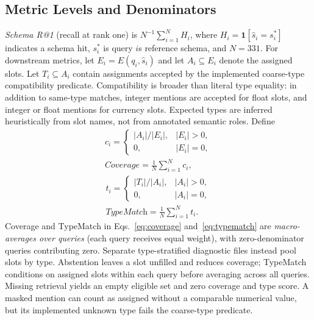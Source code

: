 \documentclass[pdflatex,iicol,sn-basic,Numbered]{sn-jnl}
\begin{document}
\subsection{Metric Levels and Denominators}\label{subsec:metrics}
\textit{Schema R@1} (recall at rank one) is $N^{-1}\sum_{i=1}^N H_i$, where $H_i=\mathbf{1}[\hat{s}_i=s_i^*]$ indicates a schema hit, $s_i^*$ is query $i$\textquotesingle s reference schema, and $N=331$. For downstream metrics, let $E_i=E(q_i,\hat{s}_i)$ and let $A_i\subseteq E_i$ denote the assigned slots. Let $T_i\subseteq A_i$ contain assignments accepted by the implemented coarse-type compatibility predicate. Compatibility is broader than literal type equality: in addition to same-type matches, integer mentions are accepted for float slots, and integer or float mentions for currency slots. Expected types are inferred heuristically from slot names, not from annotated semantic roles. Define
\begin{equation}
\begin{gathered}
c_i=\begin{cases}|A_i|/|E_i|,& |E_i|>0,\\0,& |E_i|=0,\end{cases}
\\[3pt]
\textit{Coverage}=\frac{1}{N}\sum_{i=1}^N c_i,
\end{gathered}
\label{eq:coverage}
\end{equation}
\begin{equation}
\begin{gathered}
t_i=\begin{cases}|T_i|/|A_i|,& |A_i|>0,\\0,& |A_i|=0,\end{cases}
\\[3pt]
\textit{TypeMatch}=\frac{1}{N}\sum_{i=1}^N t_i.
\end{gathered}
\label{eq:typematch}
\end{equation}
Coverage and TypeMatch in Eqs.~\eqref{eq:coverage} and~\eqref{eq:typematch} are \emph{macro-averages over queries} (each query receives equal weight), with zero-denominator queries contributing zero. Separate type-stratified diagnostic files instead pool slots by type. Abstention leaves a slot unfilled and reduces coverage; TypeMatch conditions on assigned slots within each query before averaging across all queries. Missing retrieval yields an empty eligible set and zero coverage and type score. A masked mention can count as assigned without a comparable numerical value, but its implemented unknown type fails the coarse-type predicate.
\end{document}
